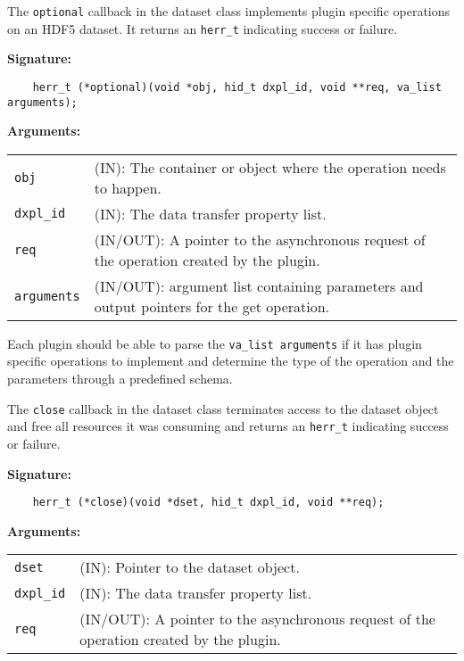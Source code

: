 The \texttt{optional} callback in the dataset class implements plugin specific operations on an HDF5 dataset. It returns an \texttt{herr\_t} indicating success or failure. \bigskip

\begin{mdframed}[style=bgbox]
\textbf{Signature:}
\begin{lstlisting}
    herr_t (*optional)(void *obj, hid_t dxpl_id, void **req, va_list arguments);
\end{lstlisting}

\textbf{Arguments:}\\
\begin{tabular}{l p{13.5cm}}
  \texttt{obj} & (IN): The container or object where the operation needs to happen.\\
  \texttt{dxpl\_id} & (IN): The data transfer property list.\\
  \texttt{req} & (IN/OUT): A pointer to the asynchronous request of the operation created by the plugin.\\
  \texttt{arguments} & (IN/OUT): argument list containing parameters and output pointers for the get operation. \\
\end{tabular}
\end{mdframed}

Each plugin should be able to parse the \texttt{va\_list arguments} if it has plugin specific operations to implement and determine the type of the operation and the parameters through a predefined schema. 

The \texttt{close} callback in the dataset class terminates access
to the dataset object and free all resources it was consuming and
returns an \texttt{herr\_t} indicating success or failure.\bigskip

\begin{mdframed}[style=bgbox]
\textbf{Signature:}
\begin{lstlisting}
    herr_t (*close)(void *dset, hid_t dxpl_id, void **req);
\end{lstlisting}

\textbf{Arguments:}\\
\begin{tabular}{l p{13.5cm}}
  \texttt{dset} & (IN): Pointer to the dataset object.\\
  \texttt{dxpl\_id} & (IN): The data transfer property list.\\
  \texttt{req} & (IN/OUT): A pointer to the asynchronous request of the
  operation created by the plugin.\\
\end{tabular}
\end{mdframed}


